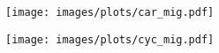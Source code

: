 \documentclass[10pt,twocolumn,letterpaper]{article}
\begin{document}
\begin{figure*}[t]
  \centering
  \begin{subfigure}[b]{0.45\textwidth}
  \texttt{[image: images/plots/car\_mig.pdf]}
    \end{subfigure}%
    \begin{subfigure}[b]{0.45\textwidth}
  \texttt{[image: images/plots/cyc\_mig.pdf]}
    \end{subfigure}%


\end{figure*}
\end{document}
